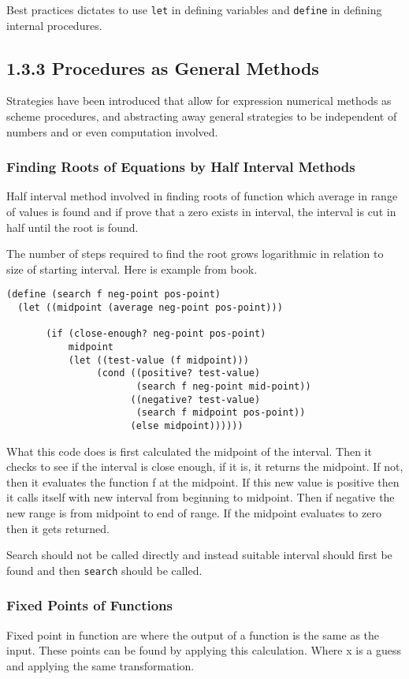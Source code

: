 \documentclass[11pt]{article}
\begin{document}
Best practices dictates to use \texttt{let} in defining variables and \texttt{define}
in defining internal procedures.

\subsection{1.3.3 Procedures as General Methods}
\label{sec:orgf1e6e5c}
Strategies have been introduced that allow for expression numerical
methods as scheme procedures, and abstracting away general strategies to
be independent of numbers and or even computation involved.

\subsubsection{Finding Roots of Equations by Half Interval Methods}
\label{sec:org626f73e}
Half interval method involved in finding roots of function which average
in range of values is found and if prove that a zero exists in interval,
the interval is cut in half until the root is found.

The number of steps required to find the root grows logarithmic in
relation to size of starting interval. Here is example from book.

\begin{verbatim}
(define (search f neg-point pos-point)
  (let ((midpoint (average neg-point pos-point)))

       (if (close-enough? neg-point pos-point)
           midpoint
           (let ((test-value (f midpoint)))
                (cond ((positive? test-value)
                       (search f neg-point mid-point))
                      ((negative? test-value)
                       (search f midpoint pos-point))
                      (else midpoint))))))
\end{verbatim}

What this code does is first calculated the midpoint of the interval.
Then it checks to see if the interval is close enough, if it is, it
returns the midpoint. If not, then it evaluates the function f at the
midpoint. If this new value is positive then it calls itself with new
interval from beginning to midpoint. Then if negative the new range is
from midpoint to end of range. If the midpoint evaluates to zero then it
gets returned.

Search should not be called directly and instead suitable interval
should first be found and then \texttt{search} should be called.

\subsubsection{Fixed Points of Functions}
\label{sec:org9499a2b}
Fixed point in function are where the output of a function is the same
as the input. These points can be found by applying this calculation.
Where x is a guess and applying the same transformation.
\end{document}
